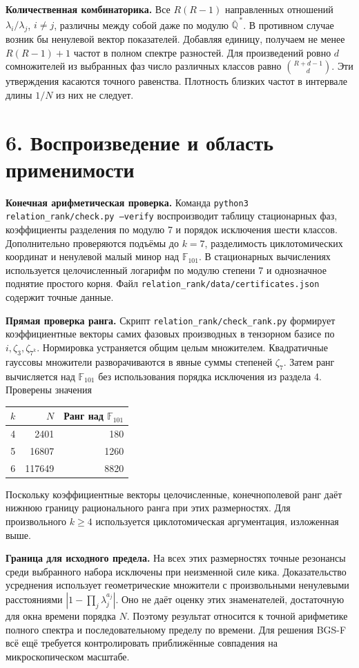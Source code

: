 \documentclass[11pt,a4paper]{article}
\newcommand{\sect}[1]{\section*{\sffamily\color{ink}#1}}
\newcommand{\subt}[1]{\par\medskip\noindent\textbf{#1.}\quad}
\newcommand{\QQ}{\mathbb Q}
\begin{document}
\subt{Количественная комбинаторика}
Все \(R(R-1)\) направленных отношений \(\lambda_i/\lambda_j\), \(i\ne j\), различны между собой даже по модулю \(\overline{\QQ}^{\,*}\). В противном случае возник бы ненулевой вектор показателей. Добавляя единицу, получаем не менее \(R(R-1)+1\) частот в полном спектре разностей. Для произведений ровно \(d\) сомножителей из выбранных фаз число различных классов равно \(\binom{R+d-1}{d}\). Эти утверждения касаются точного равенства. Плотность близких частот в интервале длины \(1/N\) из них не следует.

\newpage
\sect{6. Воспроизведение и область применимости}
\subt{Конечная арифметическая проверка}
Команда \texttt{python3 relation\_rank/check.py --verify} воспроизводит таблицу стационарных фаз, коэффициенты разделения по модулю 7 и порядок исключения шести классов. Дополнительно проверяются подъёмы до \(k=7\), разделимость циклотомических координат и ненулевой малый минор над \(\mathbb F_{101}\). В стационарных вычислениях используется целочисленный логарифм по модулю степени 7 и однозначное поднятие простого корня. Файл \texttt{relation\_rank/data/certificates.json} содержит точные данные.

\subt{Прямая проверка ранга}
Скрипт \texttt{relation\_rank/check\_rank.py} формирует коэффициентные векторы самих фазовых производных в тензорном базисе по \(i,\zeta_3,\zeta_{7^k}\). Нормировка устраняется общим целым множителем. Квадратичные гауссовы множители разворачиваются в явные суммы степеней \(\zeta_7\). Затем ранг вычисляется над \(\mathbb F_{101}\) без использования порядка исключения из раздела 4. Проверены значения
\begin{center}
\begin{tabular}{rrr}
\toprule
\(k\)&\(N\)&Ранг над \(\mathbb F_{101}\)\\
\midrule
4&2401&180\\
5&16807&1260\\
6&117649&8820\\
\bottomrule
\end{tabular}
\end{center}
Поскольку коэффициентные векторы целочисленные, конечнополевой ранг даёт нижнюю границу рационального ранга при этих размерностях. Для произвольного \(k\ge4\) используется циклотомическая аргументация, изложенная выше.

\subt{Граница для исходного предела}
На всех этих размерностях точные резонансы среди выбранного набора исключены при неизменной силе кика. Доказательство усреднения использует геометрические множители с произвольными ненулевыми расстояниями \(|1-\prod_j\lambda_j^{a_j}|\). Оно не даёт оценку этих знаменателей, достаточную для окна времени порядка \(N\). Поэтому результат относится к точной арифметике полного спектра и последовательному пределу по времени. Для решения BGS-F всё ещё требуется контролировать приближённые совпадения на микроскопическом масштабе.
\end{document}
